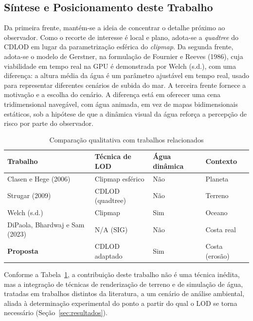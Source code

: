 \documentclass[conference]{IEEEtran}
\newcommand{\fonte}[1]{\par\vspace{2pt}{\footnotesize Fonte: #1\par}}
\begin{document}
\subsection{Síntese e Posicionamento deste Trabalho}
\label{sub:sintese}

Da primeira frente, mantém-se a ideia de concentrar o detalhe próximo ao
observador. Como o recorte de interesse é local e plano, adota-se a
\emph{quadtree} do CDLOD em lugar da parametrização esférica do
\emph{clipmap}. Da segunda frente, adota-se o modelo de Gerstner, na
formulação de Fournier e Reeves (1986), cuja viabilidade em tempo real na GPU é demonstrada por Welch
(s.d.), com uma diferença: a altura média
da água é um parâmetro ajustável em tempo real, usado para representar
diferentes cenários de subida do mar. A terceira frente fornece a motivação
e a escolha do cenário. A diferença está em oferecer uma cena
tridimensional navegável, com água animada, em vez de mapas bidimensionais
estáticos, sob a hipótese de que a dinâmica visual da água reforça a
percepção de risco por parte do observador.

\begin{table}[t]
\caption{Comparação qualitativa com trabalhos relacionados}
\label{tab:comparacao}
\centering
\begin{tabular}{@{}p{2.5cm}p{2.0cm}p{1.6cm}p{1.5cm}@{}}
\toprule
\textbf{Trabalho} & \textbf{Técnica de LOD} & \textbf{Água dinâmica} & \textbf{Contexto} \\
\midrule
Clasen e Hege (2006) & Clipmap esférico & Não & Planeta \\
Strugar (2009) & CDLOD (quadtree) & Não & Terreno \\
Welch (s.d.) & Clipmap & Sim & Oceano \\
DiPaola, Bhardwaj e Sam (2023) & N/A (SIG) & Não & Costa real \\
\textbf{Proposta} & CDLOD adaptado & Sim & Costa (erosão) \\
\bottomrule
\end{tabular}
\fonte{Elaborado pelos autores (2026).}
\end{table}

Conforme a Tabela~\ref{tab:comparacao}, a contribuição deste trabalho não é
uma técnica inédita, mas a integração de técnicas de renderização de
terreno e de simulação de água, tratadas em trabalhos distintos da literatura, a um cenário de análise ambiental, aliada à
determinação experimental do ponto a partir do qual o LOD se torna
necessário (Seção~\ref{sec:resultados}).
\end{document}
